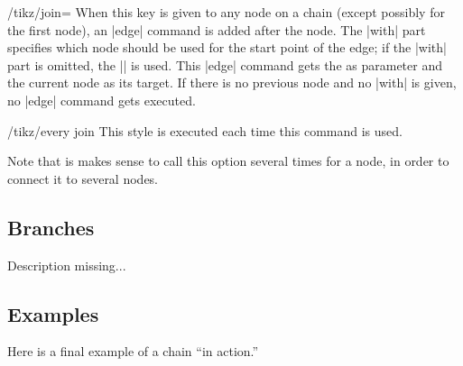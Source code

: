 \begin{key}{/tikz/join=}
  When this key is given to any node on a chain (except possibly for
  the first node), an |edge| command is added after the node. The
  |with| part specifies which node should be used for the start point
  of the edge; if the |with| part is omitted, the |\tikzchainprevious|
  is used. This |edge| command gets the  as parameter
  and the current node as its target. If there is no
  previous node and no |with| is given, no |edge| command gets
  executed.  
  \begin{stylekey}{/tikz/every join}
    This style is executed each time this command is used.
  \end{stylekey}

  Note that is makes sense to call this option several times for a
  node, in order to connect it to several nodes.
\begin{codeexample}[]
\end{codeexample}
\end{key}


\subsection{Branches}

Description missing...

\subsection{Examples}

Here is a final example of a chain ``in action.''

